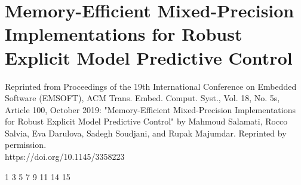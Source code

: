 
\chapter{Memory-Efficient Mixed-Precision Implementations for Robust Explicit Model Predictive Control}
\label{sec:emsoft}
Reprinted from Proceedings of the 19th International Conference on Embedded Software (EMSOFT), ACM Trans. Embed. Comput. Syst., Vol. 18, No. 5s, Article 100, October 2019: "Memory-Efficient Mixed-Precision Implementations for Robust Explicit Model Predictive Control" by Mahmoud Salamati, Rocco Salvia, Eva Darulova, Sadegh Soudjani, and Rupak Majumdar. Reprinted by permission.\\
https://doi.org/10.1145/3358223

\setupuuchapterbib

                              {1}
                            		{3}
       							{5}
                      		{7}
						{9}
                      {11}
       						{14}
                      			{15}


